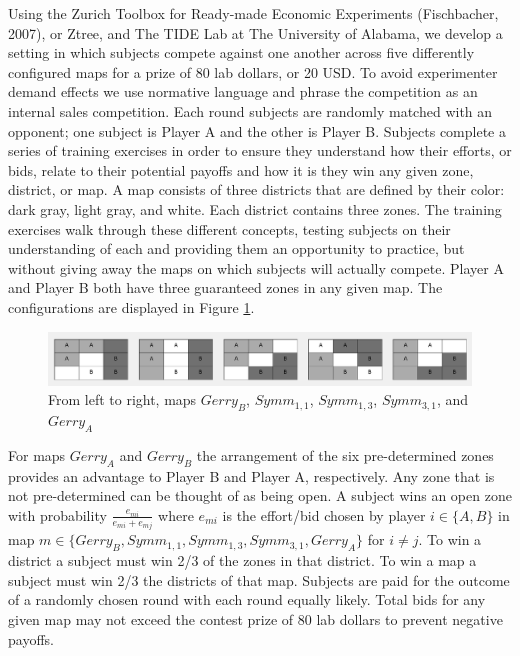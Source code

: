 \documentclass[AER]{AEA}
\begin{document}
Using the Zurich Toolbox for Ready-made Economic Experiments (Fischbacher, 2007), or Ztree, and The TIDE Lab at The University of Alabama, we develop a setting in which subjects compete against one another across five differently configured maps for a prize of 80 lab dollars, or 20 USD. To avoid experimenter demand effects we use normative language and phrase the competition as an internal sales competition. Each round subjects are randomly matched with an opponent; one subject is Player A and the other is Player B. Subjects complete a series of training exercises in order to ensure they understand how their efforts, or bids, relate to their potential payoffs and how it is they win any given zone, district, or map. A map consists of three districts that are defined by their color: dark gray, light gray, and white. Each district contains three zones. The training exercises walk through these different concepts, testing subjects on their understanding of each and providing them an opportunity to practice, but without giving away the maps on which subjects will actually compete. Player A and Player B both have three guaranteed zones in any given map. The configurations are displayed in Figure \ref{fig:maps}.
\begin{figure}[h]
\centering
\includegraphics[scale=0.4]{maps.png}
\caption{From left to right, maps $Gerry_B$, $Symm_{1,1}$, $Symm_{1,3}$, $Symm_{3,1}$, and $Gerry_A$}
\label{fig:maps}
\end{figure}
For maps $Gerry_A$ and $Gerry_B$ the arrangement of the six pre-determined zones provides an advantage to Player B and Player A, respectively. Any zone that is not pre-determined can be thought of as being open. A subject wins an open zone with probability $\frac{e_{mi}}{e_{mi}+e_{mj}}$ where $e_{mi}$ is the effort/bid chosen by player $i \in \{A,B\}$ in map $m \in \{Gerry_B, Symm_{1,1}, Symm_{1,3}, Symm_{3,1}, Gerry_A\}$ for $i \not= j$. To win a district a subject must win 2/3 of the zones in that district. To win a map a subject must win 2/3 the districts of that map. Subjects are paid for the outcome of a randomly chosen round with each round equally likely. Total bids for any given map may not exceed the contest prize of 80 lab dollars to prevent negative payoffs.
\end{document}
